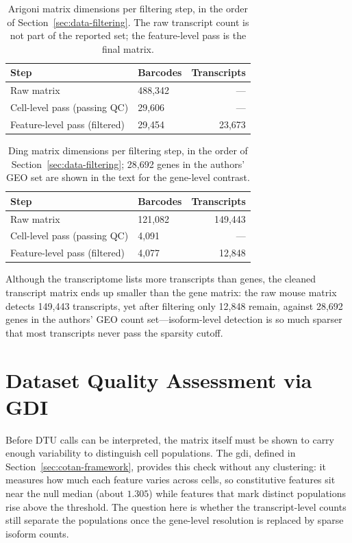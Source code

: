 \begin{table}[htbp]
    \centering
    \begin{tabular}{llr}
        \toprule
        Step & Barcodes & Transcripts \\
        \midrule
        Raw matrix & 488,342 & --- \\
        Cell-level pass (passing QC) & 29,606 & --- \\
        Feature-level pass (filtered) & 29,454 & 23,673 \\
        \bottomrule
    \end{tabular}
    \caption{Arigoni matrix dimensions per filtering step, in the order of Section~\ref{sec:data-filtering}. The raw transcript count is not part of the reported set; the feature-level pass is the final matrix.}
    \label{tab:matrix-arigoni}
\end{table}

\begin{table}[htbp]
    \centering
    \begin{tabular}{llr}
        \toprule
        Step & Barcodes & Transcripts \\
        \midrule
        Raw matrix & 121,082 & 149,443 \\
        Cell-level pass (passing QC) & 4,091 & --- \\
        Feature-level pass (filtered) & 4,077 & 12,848 \\
        \bottomrule
    \end{tabular}
    \caption{Ding matrix dimensions per filtering step, in the order of Section~\ref{sec:data-filtering}; 28,692 genes in the authors' GEO set are shown in the text for the gene-level contrast.}
    \label{tab:matrix-ding}
\end{table}

Although the transcriptome lists more transcripts than genes, the cleaned transcript matrix ends up smaller than the gene matrix: the raw mouse matrix detects 149,443 transcripts, yet after filtering only 12,848 remain, against 28,692 genes in the authors' GEO count set---isoform-level detection is so much sparser that most transcripts never pass the sparsity cutoff.

\section{Dataset Quality Assessment via GDI}

Before DTU calls can be interpreted, the matrix itself must be shown to carry enough variability to distinguish cell populations. The \gls{gdi}, defined in Section~\ref{sec:cotan-framework}, provides this check without any clustering: it measures how much each feature varies across cells, so constitutive features sit near the null median (about $1.305$) while features that mark distinct populations rise above the threshold. The question here is whether the transcript-level counts still separate the populations once the gene-level resolution is replaced by sparse isoform counts.

